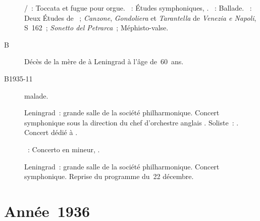 \begin{description}
 \textsc{\JBach{}/\Busoni{}}~: Toccata et fugue pour orgue.
 \textsc{\Schumann{}}~: Études symphoniques, .
 \textsc{\Chopin{}}~: Ballade.
 \textsc{\Liszt{}}~: Deux Études de \Paganini{}~; \emph{Canzone},
 \emph{Gondoliera} et \emph{Tarantella} de \emph{Venezia e Napoli}, S~162~;
 \emph{Sonetto del Petrarca}~; Méphisto-valse.
 \item[B\DateWithWeekDay{1935-10-31}]
 Décès de la mère de \VSofronitsky{} à Leningrad à l'âge de~60~ans.
 \item[B1935-11]
 \VSofronitsky{} malade.
 \item[\DateWithWeekDay{1935-12-22}]
 Leningrad~: grande salle de la société philharmonique.
 Concert symphonique sous la direction du chef d'orchestre anglais
 \ACoates{}.
 Soliste~: \VSofronitsky{}.
 Concert dédié à \ESofronitskaya{}.

 \textsc{\Scriabine{}}~: Concerto en \kF \Sharp mineur, .
 \item[\DateWithWeekDay{1935-12-24}]
 Leningrad~: grande salle de la société philharmonique.
 Concert symphonique.
 Reprise du programme du~22 décembre.
\end{description}

\section{Année~1936}

